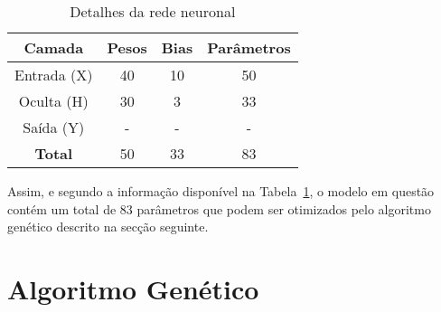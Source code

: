 \begin{table}[htpb]
    \centering
    \begin{tabular}{cccc}
        \hline
        Camada         & Pesos & Bias & Parâmetros \\ \hline
        Entrada (X)    & 40    & 10   & 50         \\
        Oculta (H)     & 30    & 3    & 33         \\
        Saída (Y)      & -     & -    & -          \\ \hline
        \textbf{Total} & 50    & 33   & 83         \\ \hline
    \end{tabular}
    \caption{Detalhes da rede neuronal}
    \label{tab:nn_summary}
\end{table}

Assim, e segundo a informação disponível na Tabela~\ref{tab:nn_summary}, o modelo em questão contém um total de 83 parâmetros que podem ser otimizados pelo algoritmo genético descrito na secção seguinte.


\section{Algoritmo Genético}\label{sec:gen_alg}
